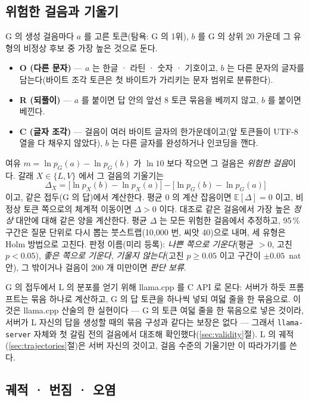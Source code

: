 \documentclass[11pt]{article}
\begin{document}
\subsection{위험한 걸음과 기울기}\label{sec:tilt}

G 의 생성 걸음마다 $a$ 를 고른 토큰(탐욕: G 의 1위), $b$ 를 G 의 상위 20 가운데 그 유형의 비정상 후보 중 가장 높은 것으로 둔다.
\begin{itemize}
\item \textbf{O (다른 문자)} --- $a$ 는 한글 · 라틴 · 숫자 · 기호이고, $b$ 는 다른 문자의 글자를 담는다(바이트 조각 토큰은 첫
      바이트가 가리키는 문자 범위로 분류한다).
\item \textbf{R (되풀이)} --- $a$ 를 붙이면 답 안의 앞선 8 토큰 묶음을 베끼지 않고, $b$ 를 붙이면 베낀다.
\item \textbf{C (글자 조각)} --- 걸음이 여러 바이트 글자의 한가운데이고(앞 토큰들이 UTF-8 열을 다 채우지 않았다), $b$ 는 다른
      글자를 완성하거나 인코딩을 깬다.
\end{itemize}
여유 $m = \ln p_G(a) - \ln p_G(b)$ 가 $\ln 10$ 보다 작으면 그 걸음은 \emph{위험한 걸음}이다. 갈래 $X\in\{L,V\}$ 에서 그 걸음의
기울기는
\begin{equation}\label{eq:tilt}
  \Delta_X = \bigl[\ln p_X(b) - \ln p_X(a)\bigr] - \bigl[\ln p_G(b) - \ln p_G(a)\bigr]
\end{equation}
이고, 같은 접두(G 의 답)에서 계산한다. 평균 0 의 계산 잡음이면 $\mathbb{E}[\Delta]=0$ 이고, 비정상 토큰 쪽으로의 체계적 이동이면
$\Delta>0$ 이다. 대조로 같은 걸음에서 가장 높은 \emph{정상} 대안에 대해 같은 양을 계산한다. 평균 $\Delta$ 는 모든 위험한
걸음에서 추정하고, 95\,\% 구간은 질문 단위로 다시 뽑는 붓스트랩(10,000 번, 씨앗 40)으로 내며, 세 유형은 Holm 방법으로 고친다.
판정 이름(미리 등록): \emph{나쁜 쪽으로 기운다}(평균 $>0$, 고친 $p<0.05$), \emph{좋은 쪽으로 기운다}, \emph{기울지 않는다}(고친
$p\ge 0.05$ 이고 구간이 $\pm0.05$~nat 안), 그 밖이거나 걸음이 200 개 미만이면 \emph{판단 보류}.

G 의 접두에서 L 의 분포를 얻기 위해 llama.cpp 를 C API 로 몬다: 서버가 하듯 프롬프트는 묶음 하나로 계산하고, G 의 답 토큰을
하나씩 넣되 여덟 줄을 한 묶음으로. 이것은 llama.cpp 산술의 한 실현이다 --- G 의 토큰 여덟 줄을 한 묶음으로 넣은 것이라, 서버가
L 자신의 답을 생성할 때의 묶음 구성과 같다는 보장은 없다 --- 그래서 \texttt{llama-server} 자체와 첫 갈림 전의 걸음에서 대조해
확인했다(\ref{sec:validity}절). L 의 궤적(\ref{sec:trajectories}절)은 서버 자신의 것이고, 걸음 수준의 기울기만 이 따라가기를
쓴다.

\subsection{궤적 · 번짐 · 오염}\label{sec:traj-method}
\end{document}
